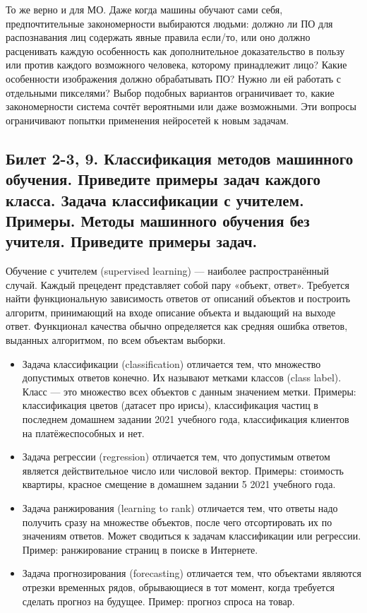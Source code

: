 \documentclass[a4paper, 12pt]{article}
\begin{document}
	То же верно и для МО. Даже когда машины обучают сами себя, предпочтительные закономерности выбираются людьми: должно ли ПО для распознавания лиц содержать явные правила если/то, или оно должно расценивать каждую особенность как дополнительное доказательство в пользу или против каждого возможного человека, которому принадлежит лицо? Какие особенности изображения должно обрабатывать ПО? Нужно ли ей работать с отдельными пикселями? Выбор подобных вариантов ограничивает то, какие закономерности система сочтёт вероятными или даже возможными. Эти вопросы ограничивают попытки применения нейросетей к новым задачам.
	
	\subsection*{Билет 2-3, 9. Классификация методов машинного обучения. Приведите примеры задач каждого класса. Задача классификации с учителем. Примеры. Методы машинного обучения без учителя. Приведите примеры задач.}
	Обучение с учителем (supervised learning) — наиболее распространённый случай. Каждый прецедент представляет собой пару «объект, ответ». Требуется найти функциональную зависимость ответов от описаний объектов и построить алгоритм, принимающий на входе описание объекта и выдающий на выходе ответ. Функционал качества обычно определяется как средняя ошибка ответов, выданных алгоритмом, по всем объектам выборки.
	\begin{itemize}
		\item Задача классификации (classification) отличается тем, что множество допустимых ответов конечно. Их называют метками классов (class label). Класс — это множество всех объектов с данным значением метки. Примеры: классификация цветов (датасет про ирисы), классификация частиц в последнем домашнем задании 2021 учебного года, классификация клиентов на платёжеспособных и нет.
		\item Задача регрессии (regression) отличается тем, что допустимым ответом является действительное число или числовой вектор. Примеры: стоимость квартиры, красное смещение в домашнем задании 5 2021 учебного года.
		\item Задача ранжирования (learning to rank) отличается тем, что ответы надо получить сразу на множестве объектов, после чего отсортировать их по значениям ответов. Может сводиться к задачам классификации или регрессии. Пример: ранжирование страниц в поиске в Интернете.
		\item Задача прогнозирования (forecasting) отличается тем, что объектами являются отрезки временных рядов, обрывающиеся в тот момент, когда требуется сделать прогноз на будущее. Пример: прогноз спроса на товар.
	\end{itemize}
	
\end{document}
